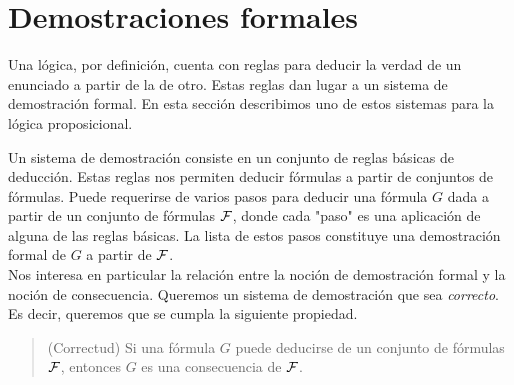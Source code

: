 \message{ !name(main.tex)}\documentclass[12pt,a4paper]{book}
\newcommand{\comillas}[1]{"#1"}
\begin{document}
    \section{Demostraciones formales}

    Una lógica, por definición, cuenta con reglas para deducir la verdad de un enunciado a partir de la de otro. Estas reglas
    dan lugar a un sistema de demostración formal. En esta sección describimos uno de estos sistemas para la lógica proposicional.

    Un sistema de demostración consiste en un conjunto de reglas básicas de deducción. Estas reglas nos permiten deducir
    fórmulas a partir de conjuntos de fórmulas. Puede requerirse de varios pasos para deducir una fórmula $G$ dada a partir de un
    conjunto de fórmulas $\mathcal{F}$, donde cada \comillas{paso} es una aplicación de alguna de las reglas básicas. La lista de estos pasos
    constituye una demostración formal de $G$ a partir de $\mathcal{F}$.\\
    Nos interesa en particular la relación entre la noción de demostración formal y la noción de consecuencia. Queremos un
    sistema de demostración que sea \textit{correcto}. Es decir, queremos que se cumpla la siguiente propiedad.

    \begin{quote}
        (Correctud) Si una fórmula $G$ puede deducirse de un conjunto de fórmulas $\mathcal{F}$, entonces $G$ es una consecuencia de $\mathcal{F}$.
    \end{quote}
\end{document}
